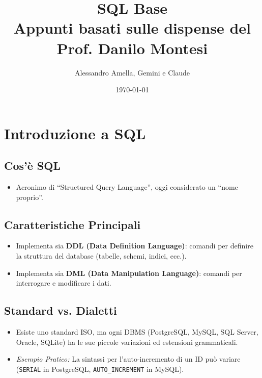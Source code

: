 

\usepackage{hyperref}

\title{SQL Base\\
  \large Appunti basati sulle dispense del Prof. Danilo Montesi}
\author{Alessandro Amella, Gemini e Claude}
\date{\today}


	
	\maketitle
	\tableofcontents
	\newpage
	
	\section{Introduzione a SQL}
	
	\subsection{Cos'è SQL}
	\begin{itemize}
		\item Acronimo di ``Structured Query Language'', oggi considerato un ``nome proprio''.
	\end{itemize}
	
	\subsection{Caratteristiche Principali}
	\begin{itemize}
		\item Implementa sia \textbf{DDL (Data Definition Language)}: comandi per definire la struttura del database (tabelle, schemi, indici, ecc.).
		\item Implementa sia \textbf{DML (Data Manipulation Language)}: comandi per interrogare e modificare i dati.
	\end{itemize}
	
	\subsection{Standard vs. Dialetti}
	\begin{itemize}
		\item Esiste uno standard ISO, ma ogni DBMS (PostgreSQL, MySQL, SQL Server, Oracle, SQLite) ha le sue piccole variazioni ed estensioni grammaticali.
		\item \textit{Esempio Pratico:} La sintassi per l'auto-incremento di un ID può variare (\texttt{SERIAL} in PostgreSQL, \texttt{AUTO\_INCREMENT} in MySQL).
	\end{itemize}
	
